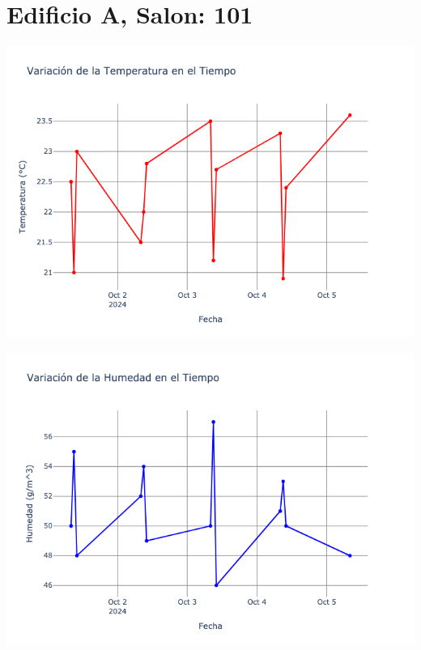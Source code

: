 \documentclass{article}
\begin{document}
    \section{Edificio A, Salon: 101}
    \noindent
    \begin{minipage}{0.48\textwidth}
        \centering
        \includegraphics[width=\textwidth]{../img/poli/TS101-90Dias-03-12-2024.png}
    \end{minipage}
    \hfill
    \begin{minipage}{0.48\textwidth}
        \centering
        \includegraphics[width=\textwidth]{../img/poli/HS101-90Dias-03-12-2024.png}
    \end{minipage}
\end{document}

